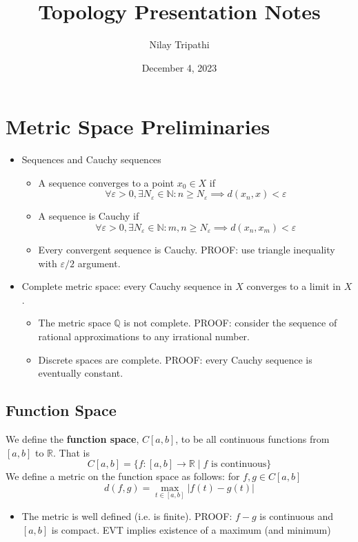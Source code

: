 \documentclass{article}
\title{Topology Presentation Notes}
\author{Nilay Tripathi }
\date{December 4, 2023}
\newcommand{\R}{\mathbb{R}}
\newcommand{\Q}{\mathbb{Q}}
\newcommand{\N}{\mathbb{N}}
\theoremstyle{plain}
\theoremstyle{definition}
\begin{document}
    \maketitle
		
		\section{Metric Space Preliminaries}
		\begin{itemize}
				\item Sequences and Cauchy sequences 
						\begin{itemize}
								\item A sequence converges to a point $x_0\in X$ if 
										\begin{equation*}
												\forall \varepsilon > 0, \exists N_{\varepsilon} \in \N : n\geq N_{\varepsilon} \implies d(x_n, x) < \varepsilon
										\end{equation*}

								\item A sequence is Cauchy if 
										\begin{equation*}
												\forall \varepsilon > 0, \exists N_{\varepsilon} \in \N : m,n \geq N_{\varepsilon} \implies d(x_n, x_m) < \varepsilon
										\end{equation*}

								\item Every convergent sequence is Cauchy. PROOF: use triangle inequality with $\varepsilon / 2$ argument. 
						\end{itemize}

				\item Complete metric space: every Cauchy sequence in $X$ converges to a limit in $X$. 
						\begin{itemize}
								\item The metric space $\Q$ is not complete. PROOF: consider the sequence of rational approximations to any irrational number. 
								\item Discrete spaces are complete. PROOF: every Cauchy sequence is eventually constant. 
						\end{itemize}
		\end{itemize}

		\subsection{Function Space}
		We define the \textbf{function space}, $C[a,b]$, to be all continuous functions from $[a,b]$ to $\R$. That is 
		\begin{equation*}
				C[a,b] = \{f : [a,b] \to \R \mid f \text{ is continuous} \}
		\end{equation*}
		We define a metric on the function space as follows: for $f,g\in C[a,b]$
		\begin{equation*}
				d(f, g) = \max_{t\in [a,b]} |f(t) - g(t)|
		\end{equation*}
		\begin{itemize}
				\item The metric is well defined (i.e. is finite). PROOF: $f-g$ is continuous and $[a,b]$ is compact. EVT implies existence of a maximum (and minimum)
		\end{itemize}
\end{document}
